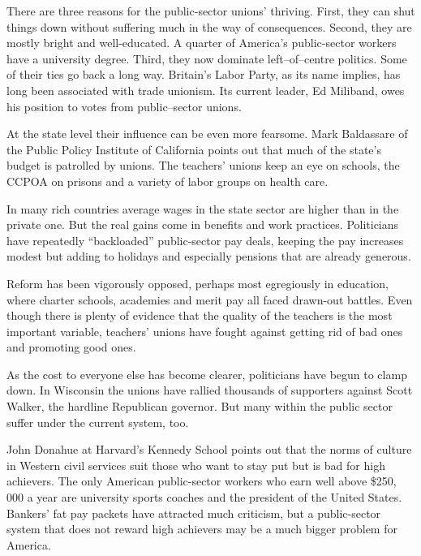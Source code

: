There are three reasons for the public-sector unions' thriving. First,
they can shut things down without suffering much in the way of
consequences. Second, they are mostly bright and well-educated. A
quarter of America's public-sector workers have a university degree.
Third, they now dominate left--of--centre politics. Some of their ties go
back a long way. Britain's Labor Party, as its name implies, has long
been associated with trade unionism. Its current leader, Ed Miliband,
owes his position to votes from public--sector unions.

At the state level their influence can be even more fearsome. Mark
Baldassare of the Public Policy Institute of California points out that
much of the state's budget is patrolled by unions. The teachers' unions
keep an eye on schools, the CCPOA on prisons and a variety of labor
groups on health care.

In many rich countries average wages in the state sector are higher than
in the private one. But the real gains come in benefits and work
practices. Politicians have repeatedly ``backloaded'' public-sector pay
deals, keeping the pay increases modest but adding to holidays and
especially pensions that are already generous.

Reform has been vigorously opposed, perhaps most egregiously in
education, where charter schools, academies and merit pay all faced
drawn-out battles. Even though there is plenty of evidence that the
quality of the teachers is the most important variable, teachers' unions
have fought against getting rid of bad ones and promoting good ones.

As the cost to everyone else has become clearer, politicians have begun
to clamp down. In Wisconsin the unions have rallied thousands of
supporters against Scott Walker, the hardline Republican governor. But
many within the public sector suffer under the current system, too.

John Donahue at Harvard's Kennedy School points out that the norms of
culture in Western civil services suit those who want to stay put but is
bad for high achievers. The only American public-sector workers who earn
well above \$250, 000 a year are university sports coaches and the
president of the United States. Bankers' fat pay packets have attracted
much criticism, but a public-sector system that does not reward high
achievers may be a much bigger problem for America.

